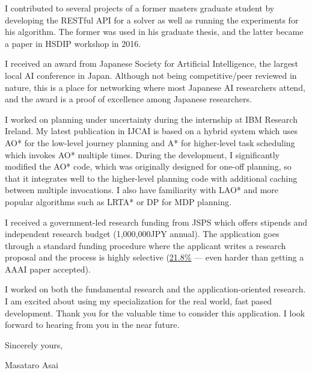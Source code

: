 \documentclass[12pt]{letter}
\begin{document}
I contributed to several projects of a former masters graduate student
by developing the RESTful API for a solver as well as running the
experiments for his algorithm. The former was used in his graduate thesis,
and the latter became a paper in HSDIP workshop in 2016.

I received an award from Japanese Society for Artificial Intelligence,
the largest local AI conference in Japan.
Although not being competitive/peer reviewed in nature,
this is a place for networking where most Japanese AI researchers attend,
and the award is a proof of excellence among Japanese researchers.

I worked on planning under uncertainty during the internship at IBM Research Ireland.
My latest publication in IJCAI is based on a hybrid system which uses
AO* for the low-level journey planning and A* for higher-level task scheduling
which invokes AO* multiple times. 
During the development, I significantly modified the AO* code, which was originally designed for one-off planning,
so that it integrates well to the higher-level planning code with additional caching between multiple invocations.
I also have familiarity with LAO* and more popular algorithms such as LRTA* or DP for MDP planning.

I received a government-led research funding from JSPS which offers
stipends and independent research budget (1,000,000JPY annual).
The application goes through a standard funding procedure where the applicant writes 
a research proposal and the process is highly selective (\href{aaa}{21.8\%} --- even harder than getting a AAAI paper accepted).




I worked on both the fundamental research and the application-oriented
research. I am excited about using my specialization for the real
world, fast pased development.
Thank you for the valuable time to consider this application. I look forward to hearing from you in the near future.

Sincerely yours,

\begin{flushright}
 Masataro Asai
\end{flushright}
\end{document}
